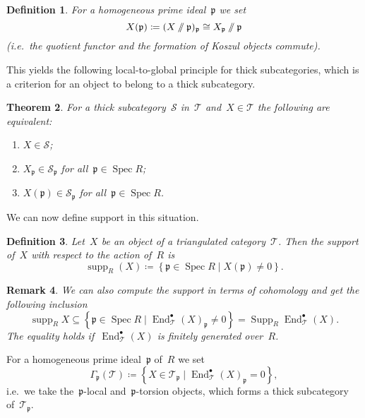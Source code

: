 \documentclass[10pt,a4paper]{article}
\theoremstyle{lecture}
\newtheorem{theorem}{Theorem}
\newtheorem{definition}[theorem]{Definition}
\newtheorem{remark}[theorem]{Remark}
\newcommand\dash{\nobreakdash-\hspace{0pt}}
\newcommand\sslash{\mathbin{/\mkern-6mu/}}
\DeclareMathOperator\End{End}
\DeclareMathOperator\Spec{Spec}
\DeclareMathOperator\Supp{Supp}
\DeclareMathOperator\supp{supp}
\begin{document}
\begin{definition}
  For a homogeneous prime ideal~$\mathfrak{p}$ we set
  \begin{equation}
    X(\mathfrak{p})\coloneqq(X\sslash\mathfrak{p})_{\mathfrak{p}}\cong X_{\mathfrak{p}}\sslash\mathfrak{p}
  \end{equation}
  (i.e.\ the quotient functor and the formation of Koszul objects commute).
\end{definition}
This yields the following local-to-global principle for thick subcategories, which is a criterion for an object to belong to a thick subcategory.
\begin{theorem}
  For a thick subcategory~$\mathcal{S}$ in~$\mathcal{T}$ and~$X\in\mathcal{T}$ the following are equivalent:
  \begin{enumerate}
    \item $X\in\mathcal{S}$;
    \item $X_{\mathfrak{p}}\in\mathcal{S}_{\mathfrak{p}}$ for all~$\mathfrak{p}\in\Spec R$;
    \item $X(\mathfrak{p})\in\mathcal{S}_{\mathfrak{p}}$ for all~$\mathfrak{p}\in\Spec R$.
  \end{enumerate}
\end{theorem}
We can now define support in this situation.
\begin{definition}
  Let~$X$ be an object of a triangulated category~$\mathcal{T}$. Then the \emph{support} of~$X$ with respect to the action of~$R$ is
  \begin{equation}
    \supp_R(X)\coloneqq\left\{ \mathfrak{p}\in\Spec R\mid X(\mathfrak{p})\neq 0 \right\}.
  \end{equation}
\end{definition}
\begin{remark}
  We can also compute the support in terms of cohomology and get the following inclusion
  \begin{equation}
    \supp_R X\subseteq\left\{ \mathfrak{p}\in\Spec R\mid\End_{\mathcal{T}}^\bullet(X)_{\mathfrak{p}}\neq 0 \right\}=\Supp_R\End_{\mathcal{T}}^\bullet(X).
  \end{equation}
  The equality holds if~$\End_{\mathcal{T}}^\bullet(X)$ is finitely generated over~$R$.
\end{remark}

For a homogeneous prime ideal~$\mathfrak{p}$ of~$R$ we set
\begin{equation}
  \Gamma_{\mathfrak{p}}(\mathcal{T})\coloneqq\left\{ X\in\mathcal{T}_{\mathfrak{p}}\mid\End_{\mathcal{T}}^\bullet(X)_{\mathfrak{p}}=0 \right\},
\end{equation}
i.e.\ we take the~$\mathfrak{p}$\dash local and~$\mathfrak{p}$\dash torsion objects, which forms a thick subcategory of~$\mathcal{T}_{\mathfrak{p}}$.
\end{document}
